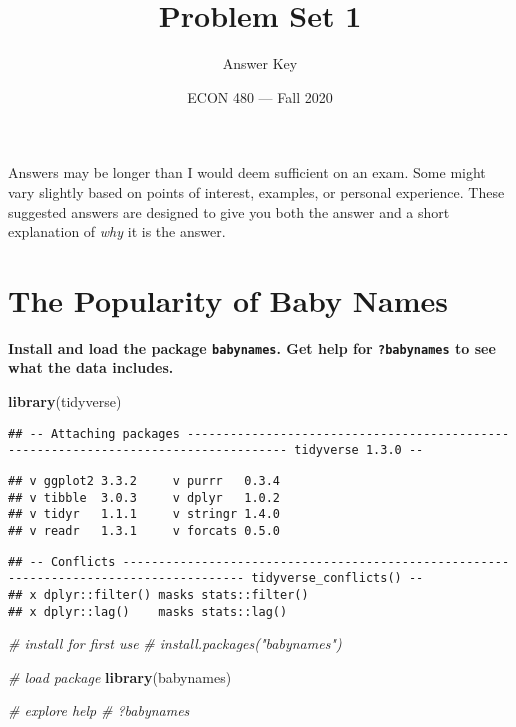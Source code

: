 \documentclass[
]{article}
\title{Problem Set 1}
\author{Answer Key}
\date{ECON 480 --- Fall 2020}
\newenvironment{Shaded}{\begin{snugshade}}{\end{snugshade}}
\newcommand{\CommentTok}[1]{\textcolor[rgb]{0.56,0.35,0.01}{\textit{#1}}}
\newcommand{\KeywordTok}[1]{\textcolor[rgb]{0.13,0.29,0.53}{\textbf{#1}}}
\newcommand{\NormalTok}[1]{#1}
\begin{document}
\maketitle

Answers may be longer than I would deem sufficient on an exam. Some
might vary slightly based on points of interest, examples, or personal
experience. These suggested answers are designed to give you both the
answer and a short explanation of \emph{why} it is the answer.

\hypertarget{the-popularity-of-baby-names}{%
\section{The Popularity of Baby
Names}\label{the-popularity-of-baby-names}}

\textbf{Install and load the package \texttt{babynames}. Get help for
\texttt{?babynames} to see what the data includes.}

\begin{Shaded}
\begin{Highlighting}[]
\KeywordTok{library}\NormalTok{(tidyverse)}
\end{Highlighting}
\end{Shaded}

\begin{verbatim}
## -- Attaching packages ------------------------------------------------------------------------------------ tidyverse 1.3.0 --
\end{verbatim}

\begin{verbatim}
## v ggplot2 3.3.2     v purrr   0.3.4
## v tibble  3.0.3     v dplyr   1.0.2
## v tidyr   1.1.1     v stringr 1.4.0
## v readr   1.3.1     v forcats 0.5.0
\end{verbatim}

\begin{verbatim}
## -- Conflicts --------------------------------------------------------------------------------------- tidyverse_conflicts() --
## x dplyr::filter() masks stats::filter()
## x dplyr::lag()    masks stats::lag()
\end{verbatim}

\begin{Shaded}
\begin{Highlighting}[]
\CommentTok{# install for first use}
\CommentTok{# install.packages("babynames")}

\CommentTok{# load package }
\KeywordTok{library}\NormalTok{(babynames)}

\CommentTok{# explore help}
\CommentTok{# ?babynames}
\end{Highlighting}
\end{Shaded}
\end{document}
